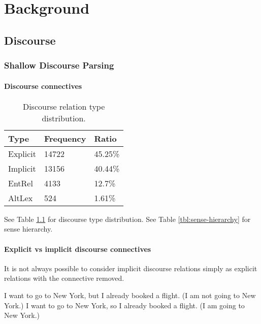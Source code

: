 
\chapter{Background}

\section{Discourse}


\subsection{Shallow Discourse Parsing}



\subsubsection{Discourse connectives}

\begin{table}[t]
\centering
\begin{tabular}{@{}lll@{}}
\toprule
Type     & Frequency & Ratio \\ \midrule
Explicit & 14722 & 45.25\%    \\
Implicit & 13156 & 40.44\%    \\
EntRel   & 4133  & 12.7\%     \\
AltLex   & 524   & 1.61\%     \\ \bottomrule
\end{tabular}
\caption{Discourse relation type distribution.}
\label{tbl:discourse-relation-type-distribution}
\end{table}
See Table \ref{tbl:discourse-relation-type-distribution} for discourse type distribution. See Table \ref{tbl:sense-hierarchy} for sense hierarchy.

\subsubsection{Explicit vs implicit discourse connectives} \label{sec:implexpl}



It is not always possible to consider implicit discourse relations simply as explicit relations with the connective removed.

\begin{exe}
\ex I want to go to New York, but I already booked a flight. (I am not going to New York.)\label{example:notny}
\ex I want to go to New York, so I already booked a flight. (I am going to New York.)\label{example:ny}
\end{exe}

